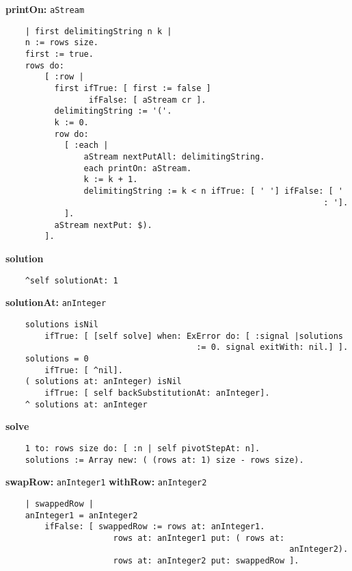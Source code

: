 {\bf printOn:} {\tt aStream}
\begin{verbatim}
    | first delimitingString n k |
    n := rows size.
    first := true.
    rows do:
        [ :row |
          first ifTrue: [ first := false ]
                 ifFalse: [ aStream cr ].
          delimitingString := '('.
          k := 0.
          row do:
            [ :each |
                aStream nextPutAll: delimitingString.
                each printOn: aStream.
                k := k + 1.
                delimitingString := k < n ifTrue: [ ' '] ifFalse: [ ' 
                                                                 : '].
            ].
          aStream nextPut: $).
        ].
\end{verbatim}
{\bf solution}
\begin{verbatim}
    ^self solutionAt: 1
\end{verbatim}
{\bf solutionAt:} {\tt anInteger}
\begin{verbatim}
    solutions isNil
        ifTrue: [ [self solve] when: ExError do: [ :signal |solutions 
                                       := 0. signal exitWith: nil.] ].
    solutions = 0
        ifTrue: [ ^nil].
    ( solutions at: anInteger) isNil
        ifTrue: [ self backSubstitutionAt: anInteger].
    ^ solutions at: anInteger
\end{verbatim}
{\bf solve}
\begin{verbatim}
    1 to: rows size do: [ :n | self pivotStepAt: n].
    solutions := Array new: ( (rows at: 1) size - rows size).
\end{verbatim}
{\bf swapRow:} {\tt anInteger1} {\bf withRow:} {\tt anInteger2}
\begin{verbatim}
    | swappedRow |
    anInteger1 = anInteger2
        ifFalse: [ swappedRow := rows at: anInteger1.
                      rows at: anInteger1 put: ( rows at: 
                                                          anInteger2).
                      rows at: anInteger2 put: swappedRow ].
\end{verbatim}

